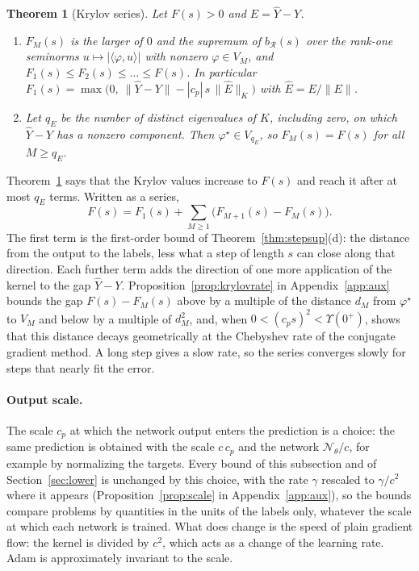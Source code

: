\documentclass[11pt]{article}
\newtheorem{theorem}{Theorem}
\theoremstyle{definition}
\theoremstyle{remark}
\newcommand{\Net}{\mathcal{N}_\theta}    %
\newcommand{\Rgh}{\mathcal{R}}           %
\newcommand{\ip}[2]{\langle #1,#2\rangle}
\begin{document}
\begin{theorem}[Krylov series]\label{thm:stepkrylov}
Let $F(s) > 0$ and $E = \hat Y - Y$.
\begin{enumerate}[label=(\alph*)]
\item $F_M(s)$ is the larger of $0$ and the supremum of $b_\Rgh(s)$ over the rank-one seminorms $u \mapsto |\ip{\varphi}{u}|$ with nonzero $\varphi \in V_M$, and $F_1(s) \le F_2(s) \le \dots \le F(s)$. In particular $F_1(s) = \max\big(0,\ \|\hat Y - Y\| - |c_p|\,s\,\|\hat E\|_K\big)$ with $\hat E = E/\|E\|$.
\item Let $q_E$ be the number of distinct eigenvalues of $K$, including zero, on which $\hat Y - Y$ has a nonzero component. Then $\varphi^\star \in V_{q_E}$, so $F_M(s) = F(s)$ for all $M \ge q_E$.
\end{enumerate}
\end{theorem}

Theorem~\ref{thm:stepkrylov} says that the Krylov values increase to $F(s)$ and reach it after at most $q_E$ terms.
Written as a series,
\begin{equation}\label{eq:series}
F(s) = F_1(s) + \sum_{M\ge1}\big(F_{M+1}(s) - F_M(s)\big).
\end{equation}
The first term is the first-order bound of Theorem~\ref{thm:stepsup}(d): the distance from the output to the labels, less what a step of length $s$ can close along that direction.
Each further term adds the direction of one more application of the kernel to the gap $\hat Y - Y$.
Proposition~\ref{prop:krylovrate} in Appendix~\ref{app:aux} bounds the gap $F(s) - F_M(s)$ above by a multiple of the distance $d_M$ from $\varphi^\star$ to $V_M$ and below by a multiple of $d_M^2$, and, when $0 < (c_ps)^2 < \Upsilon(0^+)$, shows that this distance decays geometrically at the Chebyshev rate of the conjugate gradient method.
A long step gives a slow rate, so the series converges slowly for steps that nearly fit the error.

\paragraph{Output scale.}
The scale $c_p$ at which the network output enters the prediction is a choice: the same prediction is obtained with the scale $c\,c_p$ and the network $\Net/c$, for example by normalizing the targets.
Every bound of this subsection and of Section~\ref{sec:lower} is unchanged by this choice, with the rate $\gamma$ rescaled to $\gamma/c^2$ where it appears (Proposition~\ref{prop:scale} in Appendix~\ref{app:aux}), so the bounds compare problems by quantities in the units of the labels only, whatever the scale at which each network is trained.
What does change is the speed of plain gradient flow: the kernel is divided by $c^2$, which acts as a change of the learning rate.
Adam is approximately invariant to the scale.
\end{document}
